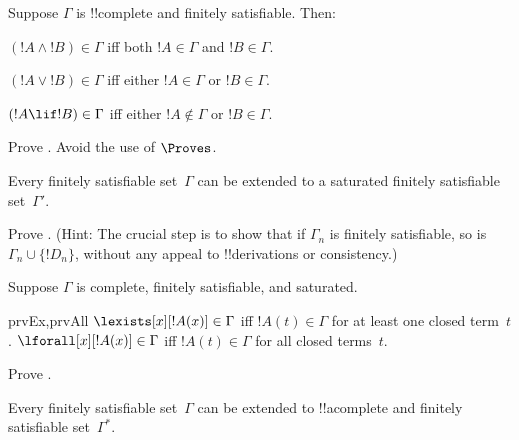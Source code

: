 \begin{prop}
Suppose $\Gamma$ is !!{complete} and finitely satisfiable. Then:
\begin{enumerate}
$(!A \land !B) \in \Gamma$
  iff both $!A \in \Gamma$ and $!B \in \Gamma$.

$(!A \lor !B) \in \Gamma$ iff
  either $!A \in \Gamma$ or $!B \in \Gamma$.

$(!A \lif !B) \in \Gamma$ iff
  either $!A \notin \Gamma$ or $!B \in \Gamma$.
\end{enumerate}
\end{prop}


\begin{prob}
Prove . Avoid the use of $\Proves$.
\end{prob}





\begin{lem}
 Every finitely satisfiable set~$\Gamma$ can
be extended to a saturated finitely satisfiable set~$\Gamma'$.
\end{lem}



\begin{prob}
Prove . (Hint: The crucial step
is to show that if $\Gamma_n$ is finitely satisfiable, so is $\Gamma_n
\cup \{!D_n\}$, without any appeal to !!{derivation}s or consistency.)
\end{prob}



\begin{prop}
Suppose $\Gamma$ is complete, finitely satisfiable, and saturated.
\begin{tagenumerate}{prvEx,prvAll}
$\lexists[x][!A(x)] \in \Gamma$ iff $!A(t) \in \Gamma$
  for at least one closed term~$t$.
$\lforall[x][!A(x)] \in \Gamma$ iff $!A(t) \in \Gamma$
  for all closed terms~$t$.
\end{tagenumerate}
\end{prop}



\begin{prob}
Prove .
\end{prob}


\begin{lem}
 Every finitely satisfiable set~$\Gamma$
can be extended to !!a{complete} and finitely satisfiable
set~$\Gamma^*$.
\end{lem}


